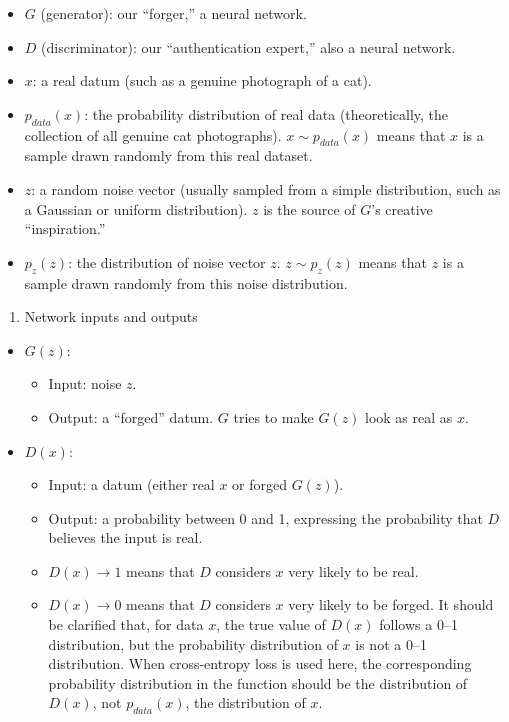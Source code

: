 \begin{itemize}
\tightlist
\item
  \(G\) (generator): our ``forger,'' a neural network.
\item
  \(D\) (discriminator): our ``authentication expert,'' also a neural network.
\item
  \(x\): a real datum (such as a genuine photograph of a cat).
\item
  \(p_{data}(x)\): the probability distribution of real data (theoretically, the collection of all genuine cat photographs). \(x \sim p_{data}(x)\) means that \(x\) is a sample drawn randomly from this real dataset.
\item
  \(z\): a random noise vector (usually sampled from a simple distribution, such as a Gaussian or uniform distribution). \(z\) is the source of \(G\)'s creative ``inspiration.''
\item
  \(p_z(z)\): the distribution of noise vector \(z\). \(z \sim p_z(z)\) means that \(z\) is a sample drawn randomly from this noise distribution.
\end{itemize}

\begin{enumerate}
\def\labelenumi{\arabic{enumi}.}
\setcounter{enumi}{1}
\tightlist
\item
  Network inputs and outputs
\end{enumerate}

\begin{itemize}
\tightlist
\item
{}
  \(G(z)\):

  \begin{itemize}
  \tightlist
  \item
    Input: noise \(z\).
  \item
    Output: a ``forged'' datum. \(G\) tries to make \(G(z)\) look as real as \(x\).
  \end{itemize}
\item
{}
  \(D(x)\):

  \begin{itemize}
  \tightlist
  \item
    Input: a datum (either real \(x\) or forged \(G(z)\)).
  \item
    Output: a probability between 0 and 1, expressing the probability that \(D\) believes the input is real.
  \item
    \(D(x)\to 1\) means that \(D\) considers \(x\) very likely to be real.
  \item
    \(D(x)\to 0\) means that \(D\) considers \(x\) very likely to be forged.
    It should be clarified that, for data \(x\), the true value of \(D(x)\) follows a 0--1 distribution, but the probability distribution of \(x\) is not a 0--1 distribution. When cross-entropy loss is used here, the corresponding probability distribution in the function should be the distribution of \(D(x)\), not \(p_{data}(x)\), the distribution of \(x\).
  \end{itemize}
\end{itemize}

